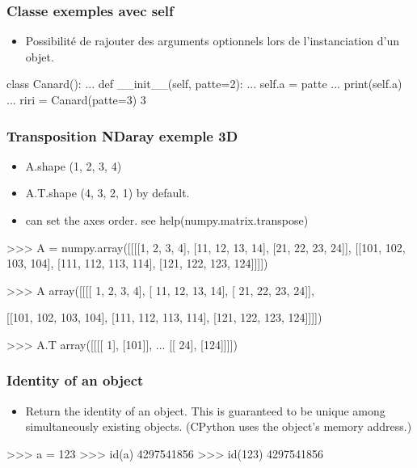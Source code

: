 \begin{frame}[fragile]
\frametitle{Classe exemples avec self}
\begin{itemize}
 \item Possibilité de rajouter des arguments optionnels lors de l'instanciation d'un objet. 
\end{itemize}
\begin{pythonConsole}
class Canard(): 
...     def __init__(self, patte=2):
...             self.a = patte
...             print(self.a)
... 
riri = Canard(patte=3)
3
\end{pythonConsole}
\end{frame}
\begin{frame}[fragile]
\frametitle{Transposition NDaray exemple 3D}
\begin{itemize}
 \item A.shape (1, 2, 3, 4)
 \item A.T.shape (4, 3, 2, 1) by default. 
 \item can set the axes order. see help(numpy.matrix.transpose)
\end{itemize}
\begin{pythonConsole}
>>> A = numpy.array([[[[1, 2, 3, 4], [11, 12, 13, 14], [21, 22, 23, 24]], [[101, 102, 103, 104], [111, 112, 113, 114], [121, 122, 123, 124]]]])

>>> A
array([[[[  1,   2,   3,   4],
         [ 11,  12,  13,  14],
         [ 21,  22,  23,  24]],

        [[101, 102, 103, 104],
         [111, 112, 113, 114],
         [121, 122, 123, 124]]]])

>>> A.T
array([[[[  1],
         [101]],
         ...
        [[ 24],
         [124]]]])
\end{pythonConsole}
\end{frame}
\begin{frame}[fragile]
\frametitle{Identity of an object}
\begin{itemize}
 \item Return the identity of an object.
    This is guaranteed to be unique among simultaneously existing objects.
    (CPython uses the object's memory address.)
\end{itemize}
\begin{pythonConsole}
>>> a = 123
>>> id(a)
4297541856
>>> id(123)
4297541856
\end{pythonConsole}
\end{frame}
